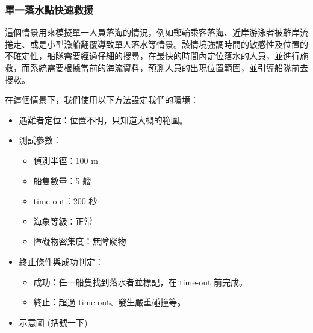 \documentclass[12pt,a4paper]{article}
\begin{document}
\subsubsection{單一落水點快速救援}
這個情景用來模擬單一人員落海的情況，例如郵輪乘客落海、近岸游泳者被離岸流捲走、或是小型漁船翻覆導致單人落水等情景。該情境強調時間的敏感性及位置的不確定性，船隊需要經過仔細的搜尋，在最快的時間內定位落水的人員，並進行施救，而系統需要根據當前的海流資料，預測人員的出現位置範圍，並引導船隊前去搜救。
\\ \par
在這個情景下，我們使用以下方法設定我們的環境：
\begin{itemize}
    \item 遇難者定位：位置不明，只知道大概的範圍。
    \item 測試參數：
    \begin{itemize}
        \item 偵測半徑：100 m
        \item 船隻數量：5 艘
        \item time-out：200 秒
        \item 海象等級：正常
        \item 障礙物密集度：無障礙物
    \end{itemize}
    \item 終止條件與成功判定：
    \begin{itemize}
        \item 成功：任一船隻找到落水者並標記，在 time-out 前完成。
        \item 終止：超過 time-out、發生嚴重碰撞等。
    \end{itemize}
    \item 示意圖 (括號一下)
\end{itemize}
\end{document}
